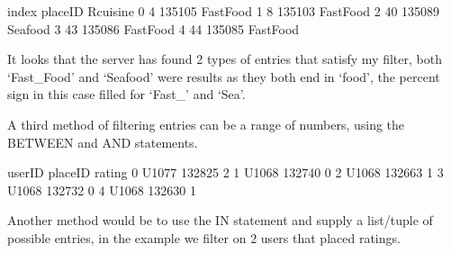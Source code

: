 \documentclass[letterpaper,10pt,english]{jupyterBook}
\begin{document}
\begin{sphinxVerbatim}[commandchars=\\\{\}]
  
\end{sphinxVerbatim}

\begin{sphinxVerbatim}[commandchars=\\\{\}]
   index  placeID   Rcuisine
0      4   135105  Fast\PYGZus{}Food
1      8   135103  Fast\PYGZus{}Food
2     40   135089    Seafood
3     43   135086  Fast\PYGZus{}Food
4     44   135085  Fast\PYGZus{}Food
\end{sphinxVerbatim}

\sphinxAtStartPar
It looks that the server has found 2 types of entries that satisfy my filter, both ‘Fast\_Food’ and ‘Seafood’ were results as they both end in ‘food’, the percent sign in this case filled for ‘Fast\_’ and ‘Sea’.

\sphinxAtStartPar
A third method of filtering entries can be a range of numbers, using the BETWEEN and AND statements.

\begin{sphinxVerbatim}[commandchars=\\\{\}]
  
\end{sphinxVerbatim}

\begin{sphinxVerbatim}[commandchars=\\\{\}]
  userID  placeID  rating
0  U1077   132825       2
1  U1068   132740       0
2  U1068   132663       1
3  U1068   132732       0
4  U1068   132630       1
\end{sphinxVerbatim}

\sphinxAtStartPar
Another method would be to use the IN statement and supply a list/tuple of possible entries, in the example we filter on 2 users that placed ratings.
\end{document}
